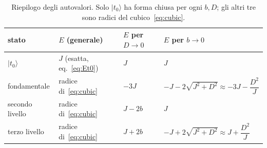 \documentclass[11pt,a4paper]{article}
\newcommand{\ket}[1]{\lvert #1 \rangle}
\theoremstyle{definition}
\begin{document}
\begin{table}[htbp]
\centering
\renewcommand{\arraystretch}{1.4}
\begin{tabular}{llll}
\toprule
stato & $E$ (generale) & $E$ per $D\to0$ & $E$ per $b\to0$ \\
\midrule
$\ket{t_0}$ & $J$ (esatta, eq.~\eqref{eq:Et0}) & $J$ & $J$ \\
fondamentale
  & radice di~\eqref{eq:cubic}
  & $-3J$
  & $-J-2\sqrt{J^2+D^2}\approx-3J-\dfrac{D^2}{J}$ \\[6pt]
secondo livello
  & radice di~\eqref{eq:cubic}
  & $J-2b$
  & $J$ \\
terzo livello
  & radice di~\eqref{eq:cubic}
  & $J+2b$
  & $-J+2\sqrt{J^2+D^2}\approx J+\dfrac{D^2}{J}$ \\
\bottomrule
\end{tabular}
\caption{Riepilogo degli autovalori. Solo $\ket{t_0}$ ha forma chiusa per ogni $b,D$; gli altri tre
sono radici del cubico~\eqref{eq:cubic}.}
\label{tab:riepilogo}
\end{table}
\end{document}
